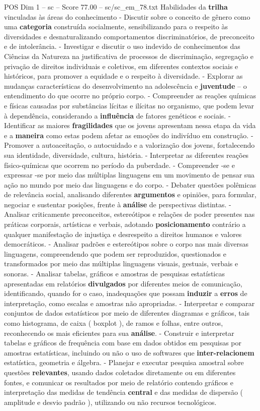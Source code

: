 \begin{textsample}{POS Dim 1 – sc – Score 77.00 – sc/sc\_em\_78.txt}
Habilidades da \textbf{trilha} vinculadas às áreas do conhecimento - Discutir sobre o conceito de gênero como uma \textbf{categoria} construída socialmente, sensibilizando para o respeito às diversidades e desnaturalizando comportamentos discriminatórios, de preconceito e de intolerância. - Investigar e discutir o uso indevido de conhecimentos das Ciências da Natureza na justificativa de processos de discriminação, segregação e privação de direitos individuais e coletivos, em diferentes contextos sociais e históricos, para promover a equidade e o respeito à diversidade. - Explorar as mudanças características do desenvolvimento na adolescência e \textbf{juventude} – o entendimento do que ocorre no próprio corpo. - Compreender as reações químicas e físicas causadas por substâncias lícitas e ilícitas no organismo, que podem levar à dependência, considerando a \textbf{influência} de fatores genéticos e sociais. - Identificar as maiores \textbf{fragilidades} que os jovens apresentam nessa etapa da vida e a \textbf{maneira} como estas podem afetar as emoções do indivíduo em construção. - Promover a autoaceitação, o autocuidado e a valorização dos jovens, fortalecendo sua identidade, diversidade, cultura, história. - Interpretar as diferentes reações físico-químicas que ocorrem no período da puberdade. - Compreender -se e expressar -se por meio das múltiplas linguagens em um movimento de pensar sua ação no mundo por meio das linguagens e do corpo. - Debater questões polêmicas de relevância social, analisando diferentes \textbf{argumentos} e opiniões, para formular, negociar e sustentar posições, frente à \textbf{análise} de perspectivas distintas. - Analisar criticamente preconceitos, estereótipos e relações de poder presentes nas práticas corporais, artísticas e verbais, adotando \textbf{posicionamento} contrário a qualquer manifestação de injustiça e desrespeito a direitos humanos e valores democráticos. - Analisar padrões e estereótipos sobre o corpo nas mais diversas linguagens, compreendendo que podem ser reproduzidos, questionados e transformados por meio das múltiplas linguagens visuais, gestuais, verbais e sonoras. - Analisar tabelas, gráficos e amostras de pesquisas estatísticas apresentadas em relatórios \textbf{divulgados} por diferentes meios de comunicação, identificando, quando for o caso, inadequações que possam \textbf{induzir} a \textbf{erros} de interpretação, como escalas e amostras não apropriadas. - Interpretar e comparar conjuntos de dados estatísticos por meio de diferentes diagramas e gráficos, tais como histograma, de caixa ( boxplot ), de ramos e folhas, entre outros, reconhecendo os mais eficientes para sua \textbf{análise}. - Construir e interpretar tabelas e gráficos de frequência com base em dados obtidos em pesquisas por amostras estatísticas, incluindo ou não o uso de softwares que \textbf{inter-relacionem} estatística, geometria e álgebra. - Planejar e executar pesquisa amostral sobre questões \textbf{relevantes}, usando dados coletados diretamente ou em diferentes fontes, e comunicar os resultados por meio de relatório contendo gráficos e interpretação das medidas de tendência \textbf{central} e das medidas de dispersão ( amplitude e desvio padrão ), utilizando ou não recursos tecnológicos.

\end{textsample}
